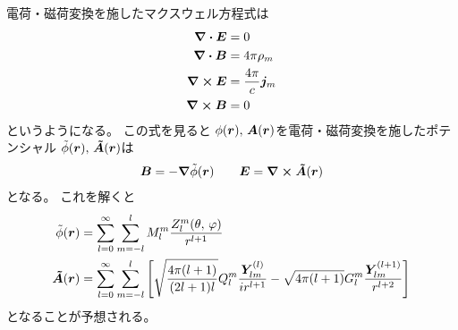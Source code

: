 \documentclass[../master.tex]{subfiles}
\begin{document}
電荷・磁荷変換を施したマクスウェル方程式は
\begin{align}
    \div \vb*{E} &= 0\\
    \div \vb*{B} &= 4\pi \rho_m\\
    \curl \vb*{E} &= \frac{4\pi}{c}\vb*{j}_m\\
    \curl \vb*{B} &= 0
\end{align}
というようになる。
この式を見ると
\(\phi(\vb*{r}),\,\vb*{A}(\vb*{r})\)を電荷・磁荷変換を施したポテンシャル
\(\tilde{\phi}(\vb*{r}),\,\vb*{\tilde{A}}(\vb*{r})\)は
\begin{align}
    \vb*{B} = -\grad{\tilde{\phi}(\vb*{r})} \qquad
    \vb*{E} = \curl \vb*{\tilde{A}}(\vb*{r})
\end{align}
となる。
これを解くと
\begin{align}
    \tilde{\phi}(\vb*{r})
    &= \sum_{l=0}^{\infty} \sum_{m=-l}^{l} M_l^m \frac{Z_l^m(\theta,\,\varphi)}{r^{l+1}}\\
    \vb*{\tilde{A}}(\vb*{r})
    &= \sum_{l=0}^{\infty} \sum_{m=-l}^{l}\qty[
        \sqrt{\frac{4\pi(l+1)}{(2l+1)l}}Q_l^m \frac{\vb*{Y}_{lm}^{(l)}}{ir^{l+1}}
        -\sqrt{4\pi(l+1)} G_l^m \frac{\vb*{Y}_{lm}^{(l+1)}}{r^{l+2}}
    ]
\end{align}
となることが予想される。
\end{document}
